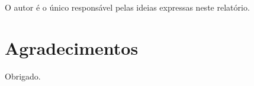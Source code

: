 \documentclass[12pt,a4paper,oneside,openany]{book}
\renewcommand{\thechapter}{\arabic{chapter}}
\begin{document}
\let\clearpage\relax
\justifying
\begin{sloppy}


\frontmatter
%
%

\begin{titlepage}

\end{titlepage}



%
%
{}

%
%



%
%
\newpage
\thispagestyle{plain}
\vspace*{\fill}
O autor é o único responsável pelas ideias expressas neste relatório.
\vspace*{\fill}

%
%
\newpage
\thispagestyle{plain}
\chapter*{Agradecimentos}
Obrigado.

%
%
\newpage
\thispagestyle{plain}

\end{sloppy}
\end{document}
